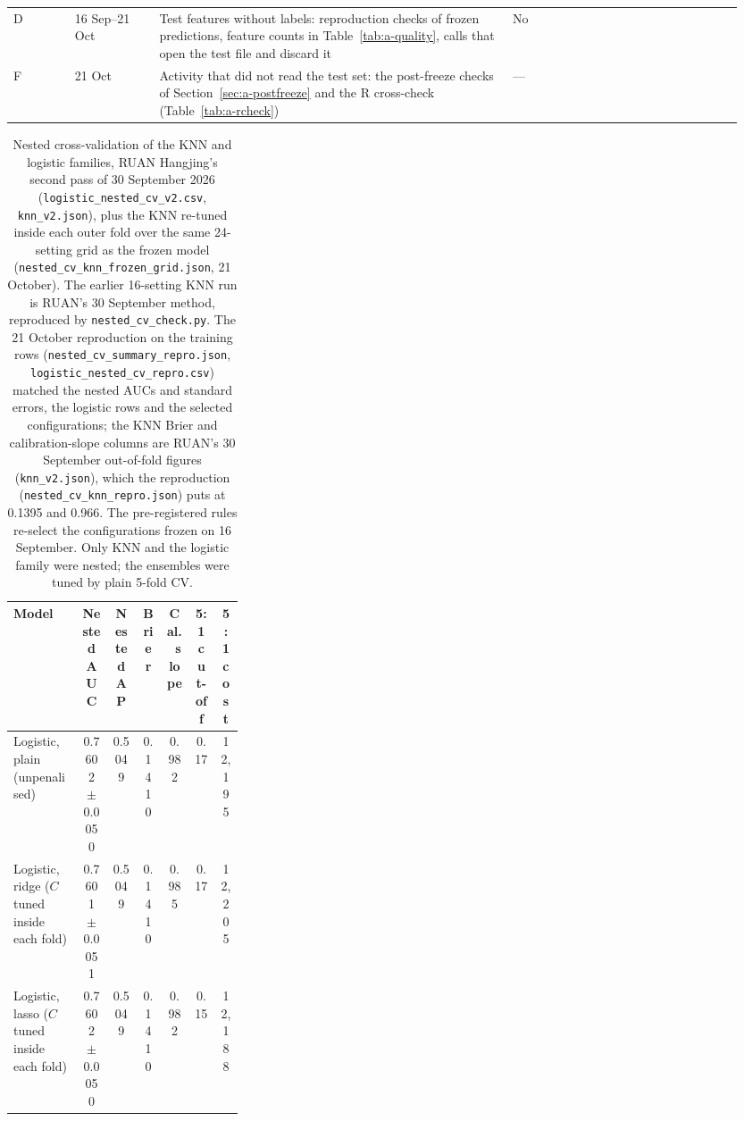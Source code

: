 \begin{table}[!htbp]
\begin{tabular}{@{}L{0.08\linewidth}L{0.11\linewidth}L{0.46\linewidth}L{0.30\linewidth}@{}}
    D & 16 Sep--21 Oct & Test features without labels: reproduction checks of frozen predictions, feature counts in Table~\ref{tab:a-quality}, calls that open the test file and discard it & No \\
    F & 21 Oct & Activity that did not read the test set: the post-freeze checks of Section~\ref{sec:a-postfreeze} and the R cross-check (Table~\ref{tab:a-rcheck}) & --- \\
    \bottomrule
  \end{tabular}
\end{table}

\begin{table}[!htbp]
  \caption{Nested cross-validation of the KNN and logistic families, RUAN Hangjing's second pass of 30 September 2026 (\texttt{logistic\_\allowbreak{}nested\_\allowbreak{}cv\_\allowbreak{}v2.csv}, \texttt{knn\_\allowbreak{}v2.json}), plus the KNN re-tuned inside each outer fold over the same 24-setting grid as the frozen model (\texttt{nested\_\allowbreak{}cv\_\allowbreak{}knn\_\allowbreak{}frozen\_\allowbreak{}grid.json}, 21 October). The earlier 16-setting KNN run is RUAN's 30 September method, reproduced by \texttt{nested\_cv\_check.py}. The 21 October reproduction on the training rows (\texttt{nested\_\allowbreak{}cv\_\allowbreak{}summary\_\allowbreak{}repro.json}, \texttt{logistic\_\allowbreak{}nested\_\allowbreak{}cv\_\allowbreak{}repro.csv}) matched the nested AUCs and standard errors, the logistic rows and the selected configurations; the KNN Brier and calibration-slope columns are RUAN's 30 September out-of-fold figures (\texttt{knn\_\allowbreak{}v2.json}), which the reproduction (\texttt{nested\_\allowbreak{}cv\_\allowbreak{}knn\_\allowbreak{}repro.json}) puts at 0.1395 and 0.966. The pre-registered rules re-select the configurations frozen on 16 September. Only KNN and the logistic family were nested; the ensembles were tuned by plain 5-fold CV.}
  \label{tab:a-nestedcv}
  \centering
  \footnotesize
  \setlength{\tabcolsep}{3pt}
  \begin{tabular}{@{}L{0.30\linewidth}cccccc@{}}
    \toprule
    Model & Nested AUC & Nested AP & Brier & Cal.\ slope & 5:1 cut-off & 5:1 cost \\
    \midrule
    Logistic, plain (unpenalised) & 0.7602 $\pm$ 0.0050 & 0.5049 & 0.1410 & 0.982 & 0.17 & 12,195 \\
    Logistic, ridge ($C$ tuned inside each fold) & 0.7601 $\pm$ 0.0051 & 0.5049 & 0.1410 & 0.985 & 0.17 & 12,205 \\
    Logistic, lasso ($C$ tuned inside each fold) & 0.7602 $\pm$ 0.0050 & 0.5049 & 0.1410 & 0.982 & 0.15 & 12,188 \\

\end{tabular}
\end{table}
